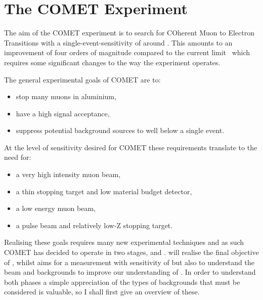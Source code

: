 

\chapter{The COMET Experiment}

The aim of the COMET experiment is to search for COherent Muon to Electron Transitions with a single-event-sensitivity of around \sensePII.
This amounts to an improvement of four orders of magnitude compared to the current limit~\cite{sindrum2006} which requires some significant changes to the way the experiment operates.

The general experimental goals of COMET are to:
\begin{itemize}
\item stop many muons in aluminium,
\item have a high signal acceptance,
\item suppress potential background sources to well below a single event.
\end{itemize}

At the level of sensitivity desired for COMET these requirements translate to the need for:
\begin{itemize}
\item a very high intensity muon beam,
\item a thin stopping target and low material budget detector,
\item a low energy muon beam,
\item a pulse beam and relatively low-Z stopping target.
\end{itemize}

Realising these goals requires many new experimental techniques and as such COMET has decided to operate in two stages, \phaseI and \phaseII.
\phaseII will realise the final objective of \sensePII, whilst \phaseI aims for a measurement with sensitivity of \sensePI but also to understand the beam and backgrounds to improve our understanding of \phaseII.
In order to understand both phases a simple appreciation of the types of backgrounds that must be considered is valuable, so I shall first give an overview of these.

